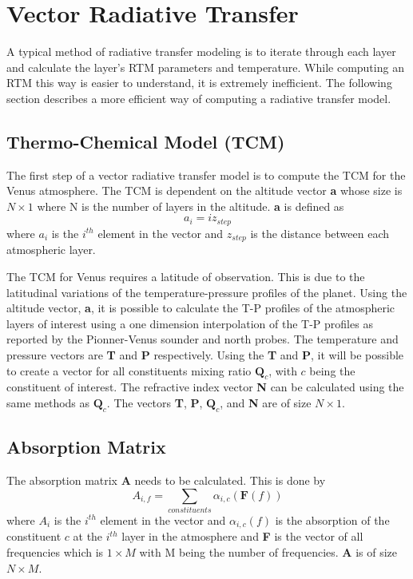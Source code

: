 \section{Vector Radiative Transfer}
A typical method of radiative transfer modeling is to iterate through each layer and calculate the layer's RTM parameters and temperature. 
While computing an RTM this way is easier to understand, it is extremely inefficient. The following section describes a more efficient way of computing a radiative transfer model.
\subsection{Thermo-Chemical Model (TCM)}
The first step of a vector radiative transfer model is to compute the TCM for the Venus atmosphere. The TCM is dependent on the altitude vector \textbf{a} whose size is $N\times 1$ where N is the number of layers in the altitude. \textbf{a} is defined as
\begin{equation}
a_i = iz_{step}
\end{equation}
where $a_i$ is the $i^{th}$ element in the vector and $z_{step}$ is the distance between each atmospheric layer. 

The TCM for Venus requires a latitude of observation. This is due to the latitudinal variations of the temperature-pressure profiles of the planet. 
Using the altitude vector, \textbf{a}, it is possible to calculate the T-P profiles of the atmospheric layers of interest using a one dimension interpolation of the T-P profiles as reported by the Pionner-Venus sounder and north probes. 
The temperature and pressure vectors are \textbf{T} and \textbf{P} respectively. Using the \textbf{T} and \textbf{P}, it will be possible to create a vector for all constituents mixing ratio $\textbf{Q}_{c}$, with $c$ being the constituent of interest. The refractive index vector \textbf{N} can be calculated using the same methods as $\textbf{Q}_{c}$. The vectors \textbf{T}, \textbf{P}, $\textbf{Q}_{c}$, and \textbf{N} are of size $N\times 1$.

\subsection{Absorption Matrix}
The absorption matrix \textbf{A} needs to be calculated. This is done by
\begin{equation}
A_{i,f} = \sum_{constituents} \alpha_{i,c}(\textbf{F}(f))
\end{equation}
where $A_i$ is the $i^{th}$ element in the vector and $\alpha_{i,c}(f)$ is the absorption of the constituent $c$ at the $i^{th}$ layer in the atmosphere  and \textbf{F} is the vector of all frequencies which is $1 \times M$ with M being the number of frequencies. \textbf{A} is of size $N \times M$.

